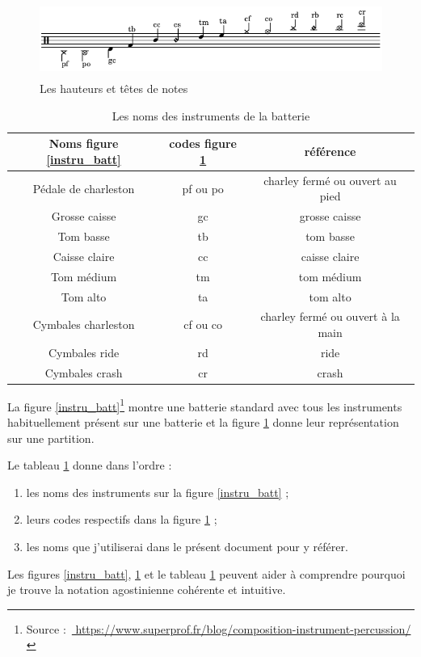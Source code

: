 \begin{figure}[!h]
\centering
\includegraphics[height=25mm, width=130mm]{
z_images/3_methodes/0_notation_de_la_batterie/2_hauteurs_et_tete_de_notes.png}
\caption{Les hauteurs et têtes de notes}
\label{haut}
\end{figure}

\begin{table}[h]
\centering
\begin{tabular}{|c|c|c|} \hline
Noms figure \ref{instru_batt} & codes figure \ref{haut}  & référence \\ \hline
Pédale de charleston & pf ou po & charley fermé ou ouvert au pied \\
Grosse caisse & gc & grosse caisse \\
Tom basse & tb & tom basse \\
Caisse claire & cc & caisse claire \\
Tom médium & tm & tom médium \\
Tom alto & ta & tom alto \\
Cymbales charleston & cf ou co & charley fermé ou ouvert à la main \\
Cymbales ride & rd & ride \\
Cymbales crash & cr & crash \\ \hline
	\end{tabular}
	\caption{Les noms des instruments de la batterie}
	\label{nom_instru_batt}
\end{table}\newpage
La figure \ref{instru_batt}\footnote{Source : \url{
https://www.superprof.fr/blog/composition-instrument-percussion/}} montre une
batterie standard avec tous les instruments habituellement présent sur une
batterie et la figure \ref{haut} donne leur représentation sur une partition.

Le tableau \ref{nom_instru_batt} donne dans l’ordre :
\begin{enumerate}
    \item les noms des instruments sur la figure \ref{instru_batt} ;
    \item leurs codes respectifs dans la figure \ref{haut} ;
    \item les noms que j’utiliserai dans le présent document pour y référer.
\end{enumerate}
Les figures \ref{instru_batt}, \ref{haut} et le tableau \ref{nom_instru_batt}
peuvent aider à comprendre pourquoi je trouve la notation agostinienne
cohérente et intuitive.

